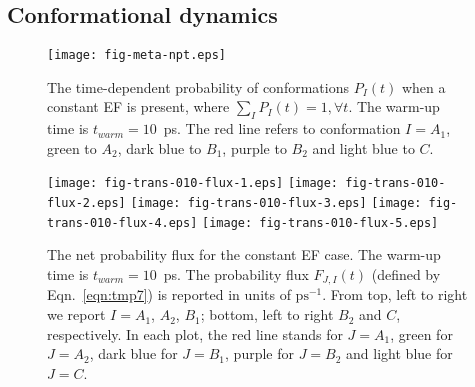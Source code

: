 \documentclass[a4paper,preprint,unsortedaddress,onecolumn]{revtex4-1}
\newcommand{\recheck}[1]{{\color{red} #1}}
\begin{document}
\subsection{Conformational dynamics}


\begin{figure}
  \centering
  \texttt{[image: fig-meta-npt.eps]}
  \caption{\recheck{The time-dependent probability of conformations $P_I(t)$ 
    when a constant EF is present, where $\sum_I P_I(t) = 1, \forall t$.}
    The warm-up time is $t_{warm} = 10$~ps. The red line refers to conformation $I = A_1$,
    green to $A_2$, dark blue to $B_1$, purple to $B_2$ and light blue
    to $C$. 
  }
  \label{fig:tmp5}
\end{figure}

\begin{figure}
  \centering
  \texttt{[image: fig-trans-010-flux-1.eps]}
  \texttt{[image: fig-trans-010-flux-2.eps]}
  \texttt{[image: fig-trans-010-flux-3.eps]}
  \texttt{[image: fig-trans-010-flux-4.eps]}
  \texttt{[image: fig-trans-010-flux-5.eps]}
  \caption{\recheck{
    The net probability flux for the constant EF case.
    The warm-up time is $t_{warm} = 10$~ps.
    The probability flux $F_{J,I}(t)$ (defined by Eqn.~\eqref{eqn:tmp7}) is reported in units of $\textrm{ps}^{-1}$.
    From top, left to right we report $I = A_1$, $A_2$, $B_1$; bottom, left to right $B_2$ and
    $C$, respectively. In each plot, the red line stands for $J=A_1$,
    green for $J=A_2$, dark blue for $J=B_1$, purple for $J=B_2$ and light blue
    for $J=C$.} 
    }
  \label{fig:tmp6}
\end{figure}
\end{document}
